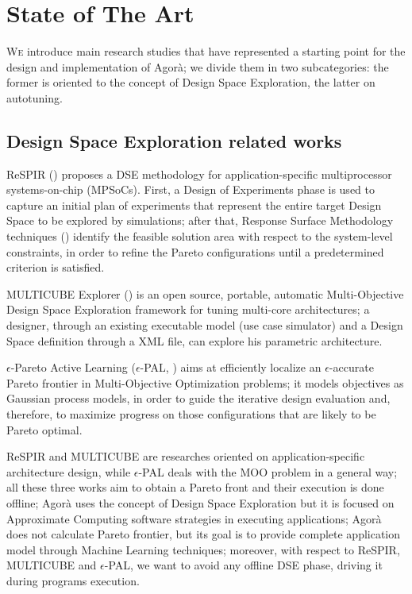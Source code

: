 \chapter{State of The Art}\label{sota}

\lettrine{W}{e} introduce main research studies that have represented a starting point for the design and implementation of A\-go\-rà; we divide them in two subcategories: the former is oriented to the concept of Design Space Exploration, the latter on autotuning.

\section{Design Space Exploration related works}

ReSPIR (\cite{palermo2009respir}) proposes a DSE methodology for application-spe\-cif\-ic multiprocessor systems-on-chip (MPSoCs). First, a Design of Experiments phase is used to capture an initial plan of experiments that represent the entire target Design Space to be explored by simulations; after that, Response Surface Methodology techniques (\cite{khuri2010response}) identify the feasible solution area with respect to the system-level constraints, in order to refine the Pareto configurations until a predetermined criterion is satisfied.

MULTICUBE Explorer (\cite{silvano2011multicube}) is an open source, portable, automatic Multi-Objective Design Space Exploration framework for tuning multi-core architectures; a designer, through an existing executable model (use case simulator) and a Design Space definition through a XML file, can explore his parametric architecture.

$\epsilon$-Pareto Active Learning ($\epsilon$-PAL, \cite{zuluaga2016e}) aims at efficiently localize an $\epsilon$-accurate Pareto frontier in Multi-Objective Optimization problems; it models objectives as Gaussian process models, in order to guide the iterative design evaluation and, therefore, to maximize progress on those configurations that are likely to be Pareto optimal.

ReSPIR and MULTICUBE are researches oriented on ap\-pli\-ca\-tion-specific architecture design, while $\epsilon$-PAL deals with the MOO problem in a general way; all these three works aim to obtain a Pareto front and their execution is done offline; Agorà uses the concept of Design Space Exploration but it is focused on Approximate Computing software strategies in executing applications; Agorà does not calculate Pareto frontier, but its goal is to provide complete application model through Machine Learning techniques; moreover, with respect to ReSPIR, MULTICUBE and $\epsilon$-PAL, we want to avoid any offline DSE phase, driving it during programs execution.

